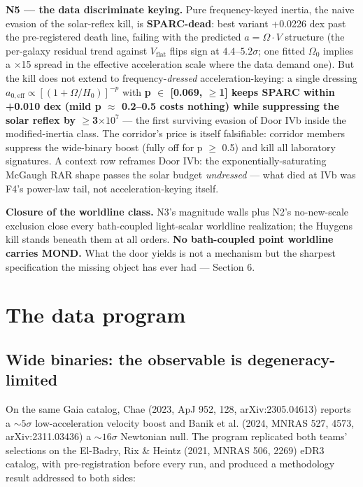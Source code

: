\documentclass[11pt,a4paper]{article}
\begin{document}
\textbf{N5 --- the data discriminate keying.} Pure frequency-keyed inertia, the naive evasion of the solar-reflex kill, is \textbf{SPARC-dead}: best variant +0.0226 dex past the pre-registered death line, failing with the predicted $a = \Omega\cdot V$ structure (the per-galaxy residual trend against $V_{\mathrm{flat}}$ flips sign at $4.4$--$5.2\sigma$; one fitted $\Omega_{0}$ implies a $\times$15 spread in the effective acceleration scale where the data demand one). But the kill does not extend to frequency-\emph{dressed} acceleration-keying: a single dressing $a_{0,\mathrm{eff}} \propto [(1+\Omega/H_0)]^{-p}$ with \textbf{p $\in$ [0.069, $\ge$1] keeps SPARC within +0.010 dex (mild p $\approx$ 0.2--0.5 costs nothing) while suppressing the solar reflex by $\ge$3$\times10^{7}$} --- the first surviving evasion of Door IVb inside the modified-inertia class. The corridor's price is itself falsifiable: corridor members suppress the wide-binary boost (fully off for p $\ge$ 0.5) and kill all laboratory signatures. A context row reframes Door IVb: the exponentially-saturating McGaugh RAR shape passes the solar budget \emph{undressed} --- what died at IVb was F4's power-law tail, not acceleration-keying itself.

\textbf{Closure of the worldline class.} N3's magnitude walls plus N2's no-new-scale exclusion close every bath-coupled light-scalar worldline realization; the Huygens kill stands beneath them at all orders. \textbf{No bath-coupled point worldline carries MOND.} What the door yields is not a mechanism but the sharpest specification the missing object has ever had --- Section 6.

\section{The data program}

\subsection{Wide binaries: the observable is degeneracy-limited}

On the same Gaia catalog, Chae (2023, ApJ 952, 128, arXiv:2305.04613) reports a $\sim{}5\sigma$ low-acceleration velocity boost and Banik et al. (2024, MNRAS 527, 4573, arXiv:2311.03436) a $\sim{}16\sigma$ Newtonian null. The program replicated both teams' selections on the El-Badry, Rix \& Heintz (2021, MNRAS 506, 2269) eDR3 catalog, with pre-registration before every run, and produced a methodology result addressed to both sides:
\end{document}
